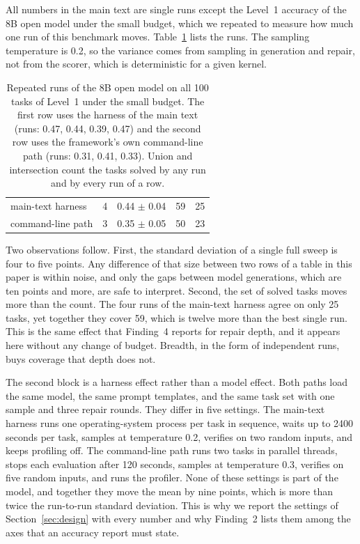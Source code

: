 All numbers in the main text are single runs except the Level~1 accuracy of the 8B open model
under the small budget, which we repeated to measure how much one run of this benchmark moves.
Table~\ref{tab:app-variance} lists the runs. The sampling temperature is 0.2, so the variance comes
from sampling in generation and repair, not from the scorer, which is deterministic for a given
kernel.

\begin{table}[t]
\centering
\small
\setlength{\tabcolsep}{5pt}
\caption{Repeated runs of the 8B open model on all 100 tasks of Level~1 under the small budget.
The first row uses the harness of the main text (runs: 0.47, 0.44, 0.39, 0.47) and the second row
uses the framework's own command-line path (runs: 0.31, 0.41, 0.33). Union and intersection count
the tasks solved by any run and by every run of a row.}
\label{tab:app-variance}
\begin{tabular}{@{}lrrrr@{}}
\toprule
\headrow{Path} & \headrow{Runs} & \headrow{Mean $\pm$ sd} & \headrow{Union} & \headrow{Inter.} \\
\midrule
main-text harness & 4 & 0.44 $\pm$ 0.04 & 59 & 25 \\
command-line path & 3 & 0.35 $\pm$ 0.05 & 50 & 23 \\
\bottomrule
\end{tabular}
\end{table}

Two observations follow. First, the standard deviation of a single full sweep is four to five
points. Any difference of that size between two rows of a table in this paper is within noise, and
only the gaps between model generations, which are ten points and more, are safe to interpret.
Second, the set of solved tasks moves more than the count. The four runs of the main-text harness
agree on only 25 tasks, yet together they cover 59, which is twelve more than the best single run.
This is the same effect that Finding~4 reports for repair depth, and it appears here without any
change of budget. Breadth, in the form of independent runs, buys coverage that depth does not.

The second block is a harness effect rather than a model effect. Both paths load the same model,
the same prompt templates, and the same task set with one sample and three repair rounds. They
differ in five settings. The main-text harness runs one operating-system process per task in
sequence, waits up to 2400 seconds per task, samples at temperature 0.2, verifies on two random
inputs, and keeps profiling off. The command-line path runs two tasks in parallel threads, stops
each evaluation after 120 seconds, samples at temperature 0.3, verifies on five random inputs, and
runs the profiler. None of these settings is part of the model, and together they move the mean by
nine points, which is more than twice the run-to-run standard deviation. This is why we report the
settings of Section~\ref{sec:design} with every number and why Finding~2 lists them among the axes
that an accuracy report must state.


